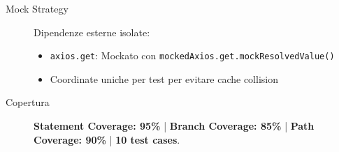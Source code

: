 \begin{description}
    \item[Mock Strategy] Dipendenze esterne isolate:
    \begin{itemize}
        \item \texttt{axios.get}: Mockato con \texttt{mockedAxios.get.mockResolvedValue()}
        \item Coordinate uniche per test per evitare cache collision
    \end{itemize}
    
    \item[Copertura] \textbf{Statement Coverage: 95\%} | \textbf{Branch Coverage: 85\%} | \textbf{Path Coverage: 90\%} | \textbf{10 test cases}.
\end{description}